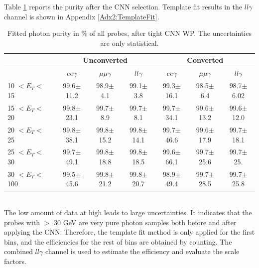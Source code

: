 Table \ref{tab:gamma:CNN:Zllg:Purity:A} reports the purity after the CNN selection. Template fit results in the $ll\gamma$ channel is shown in Appendix \ref{Adx2:TemplateFit}.
\begin{table}[htbp]
\begin{longtable}[c]{lcccccc}
\hline\hline
                             & \multicolumn{3}{c}{Unconverted}               & \multicolumn{3}{c}{Converted}                \\
                            \hline
\endfirsthead
%
\endhead
%
                             & $ee\gamma$           & $\mu\mu\gamma$           & $ll\gamma$           & $ee\gamma$           &  $\mu\mu\gamma$          & $ll\gamma$           \\
    \hline
10 $ < E_T < $ 15 & 99.6$\pm$11.2    & 98.9$\pm$4.1       & 99.1$\pm$3.8    & 99.3$\pm$16.1    & 98.5$\pm$6.4     & 98.7$\pm$6.02  \\
15 $ < E_T < $ 20 & 99.8$\pm$23.1    & 99.7$\pm$8.9       & 99.7$\pm$8.1    & 99.7$\pm$34.1    & 99.6$\pm$13.2    & 99.6$\pm$12.0 \\
20 $ < E_T < $ 25 & 99.8$\pm$38.1    & 99.8$\pm$15.2      & 99.8$\pm$14.1   & 99.7$\pm$46.6    & 99.6$\pm$17.9    & 99.7$\pm$18.1  \\
25 $ < E_T < $ 30  & 99.7$\pm$49.1   & 99.8$\pm$18.8      & 99.8$\pm$18.5   & 99.6$\pm$66.1    & 99.7$\pm$25.6    & 99.7$\pm$25.    \\
30 $ < E_T < $ 100 & 99.5$\pm$45.6   & 99.8$\pm$21.2      & 99.8$\pm$20.7   & 98.9$\pm$49.4    & 99.7$\pm$28.5    & 99.7$\pm$25.8     \\
\hline\hline
\end{longtable}
\begin{tcolorbox}[colback=black!5!white,colframe=white!75!black]
\caption{Fitted photon purity in \%  of all probes, after tight CNN WP. The uncertainties are only statistical.}
\label{tab:gamma:CNN:Zllg:Purity:A}
\end{tcolorbox}
\end{table}
\\
The low amount of data at high \eT leads to large uncertainties. It indicates that the probes with \eT $>$ 30 GeV are very pure photon samples both before and after applying the CNN. Therefore, the template fit method is only applied for the first \eT bins, and the efficiencies for the rest of bins are obtained by counting. The combined $ll\gamma$ channel is used to estimate the efficiency and evaluate the scale factors.   
